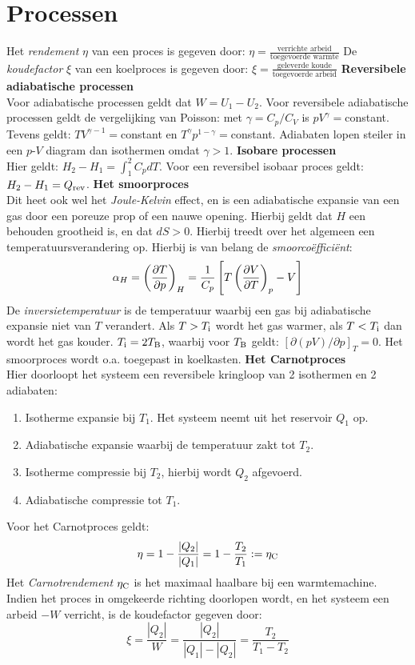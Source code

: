 \documentclass[twoside]{report}
\begin{document}
\section{Processen}
Het {\it rendement} $\eta$ van een proces is gegeven door:
$\displaystyle\eta=\frac{\mbox{verrichte arbeid}}{\mbox{toegevoerde warmte}}$
\npar
De {\it koudefactor} $\xi$ van een koelproces is gegeven door:
$\displaystyle\xi=\frac{\mbox{geleverde koude}}{\mbox{toegevoerde arbeid}}$
\npar
{\bf Reversibele adiabatische processen}\\[2mm]
Voor adiabatische processen geldt dat $W=U_1-U_2$. Voor reversibele
adiabatische processen geldt de vergelijking van Poisson: met
$\gamma=C_p/C_V$ is $pV^\gamma=$constant. Tevens geldt:
$TV^{\gamma-1}=$constant en $T^\gamma p^{1-\gamma}=$constant. Adiabaten lopen
steiler in een $p$-$V$ diagram dan isothermen omdat $\gamma>1$.
\npar
{\bf Isobare processen}\\[2mm]
Hier geldt: $H_2-H_1=\int_1^2 C_pdT$. Voor een reversibel isobaar proces
geldt: $H_2-H_1=Q_{\rm rev}$.
\npar
{\bf Het smoorproces}\\[2mm]
Dit heet ook wel het {\it Joule-Kelvin} effect, en is een adiabatische
expansie van een gas door een poreuze prop of een nauwe opening. Hierbij
geldt dat $H$ een behouden grootheid is, en dat $dS>0$. Hierbij treedt over
het algemeen een temperatuursverandering op. Hierbij is van belang de
{\it smoorco\"effici\"ent}:
\[
\alpha_H=\left(\frac{\partial T}{\partial p}\right)_{H}=\frac{1}{C_p}\left[T\left(\frac{\partial V}{\partial T}\right)_{p}-V\right]
\]
De {\it inversietemperatuur} is de temperatuur waarbij een gas bij
adiabatische expansie niet van $T$ verandert. Als $T>T_{\rm i}$ wordt het gas
warmer, als $T<T_{\rm i}$ dan wordt het gas kouder. $T_{\rm i}=2T_{\rm B}$,
waarbij voor $T_{\rm B}$ geldt: $[\partial(pV)/\partial p]_T=0$. Het
smoorproces wordt o.a. toegepast in koelkasten.
\npar
{\bf Het Carnotproces}\\[2mm]
Hier doorloopt het systeem een reversibele kringloop van 2 isothermen en 2
adiabaten:
\begin{enumerate}
\item Isotherme expansie bij $T_1$. Het systeem neemt uit het reservoir $Q_1$ op.
\item Adiabatische expansie waarbij de temperatuur zakt tot $T_2$.
\item Isotherme compressie bij $T_2$, hierbij wordt $Q_2$ afgevoerd.
\item Adiabatische compressie tot $T_1$.
\end{enumerate}
Voor het Carnotproces geldt:
\[
\eta=1-\frac{|Q_2|}{|Q_1|}=1-\frac{T_2}{T_1}:=\eta_{\rm C}
\]
Het {\it Carnotrendement} $\eta_{\rm C}$ is het maximaal haalbare bij een
warmtemachine. Indien het proces in omgekeerde richting doorlopen wordt, en
het systeem een arbeid $-W$ verricht, is de koudefactor gegeven door:
\[
\xi=\frac{|Q_2|}{W}=\frac{|Q_2|}{|Q_1|-|Q_2|}=\frac{T_2}{T_1-T_2}
\]
\end{document}
